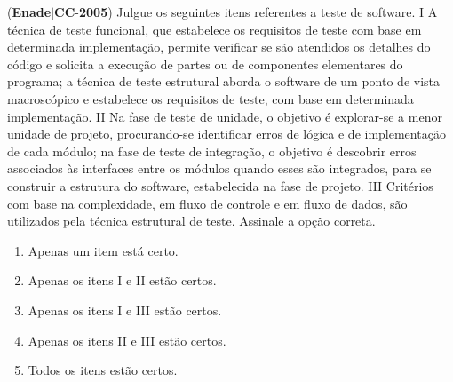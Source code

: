 \documentclass{exam}
\begin{document}
\begin{questions}
\question (\textbf{Enade}$|$\textbf{CC}-\textbf{2005}) Julgue os seguintes itens referentes a teste de software.
I A técnica de teste funcional, que estabelece os requisitos de
teste com base em determinada implementação, permite
verificar se são atendidos os detalhes do código e solicita a
execução de partes ou de componentes elementares do
programa; a técnica de teste estrutural aborda o software de
um ponto de vista macroscópico e estabelece os requisitos
de teste, com base em determinada implementação.
II Na fase de teste de unidade, o objetivo é explorar-se a
menor unidade de projeto, procurando-se identificar erros de
lógica e de implementação de cada módulo; na fase de teste
de integração, o objetivo é descobrir erros associados às
interfaces entre os módulos quando esses são integrados,
para se construir a estrutura do software, estabelecida na
fase de projeto.
III Critérios com base na complexidade, em fluxo de controle
e em fluxo de dados, são utilizados pela técnica estrutural de
teste.
Assinale a opção correta.
	\begin{enumerate}[label=\alph*)]
		\item  Apenas um item está certo.
		\item  Apenas os itens I e II estão certos.
		\item  Apenas os itens I e III estão certos.
		\item  Apenas os itens II e III estão certos.
		\item  Todos os itens estão certos.

	\end{enumerate}


\end{questions}
\end{document}
